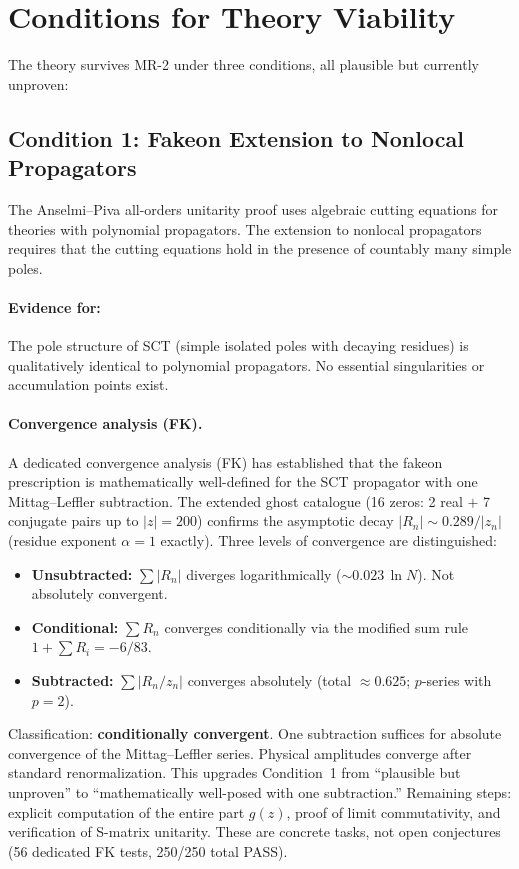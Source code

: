 \documentclass[11pt,a4paper]{article}
\begin{document}
\section{Conditions for Theory Viability}
\label{sec:conditions}

The theory survives MR-2 under three conditions, all plausible but
currently unproven:

\subsection{Condition 1: Fakeon Extension to Nonlocal Propagators}

The Anselmi--Piva all-orders unitarity proof \cite{Anselmi2018} uses
algebraic cutting equations for theories with polynomial propagators.
The extension to nonlocal propagators requires that the cutting equations
hold in the presence of countably many simple poles.

\paragraph{Evidence for:} The pole structure of SCT (simple isolated
poles with decaying residues) is qualitatively identical to polynomial
propagators.  No essential singularities or accumulation points exist.

\paragraph{Convergence analysis (FK).}
A dedicated convergence analysis (FK) has established that the
fakeon prescription is mathematically well-defined for the SCT
propagator with one Mittag--Leffler subtraction.  The extended ghost
catalogue (16 zeros: 2 real $+$ 7 conjugate pairs up to $|z| = 200$)
confirms the asymptotic decay $|R_n| \sim 0.289/|z_n|$ (residue
exponent $\alpha = 1$ exactly).  Three levels of convergence are
distinguished:
\begin{itemize}[nosep]
  \item \textbf{Unsubtracted:} $\sum |R_n|$ diverges logarithmically
    ($\sim 0.023\,\ln N$).  Not absolutely convergent.
  \item \textbf{Conditional:} $\sum R_n$ converges conditionally via the
    modified sum rule $1 + \sum R_i = -6/83$.
  \item \textbf{Subtracted:} $\sum |R_n/z_n|$ converges absolutely
    (total $\approx 0.625$; $p$-series with $p = 2$).
\end{itemize}
Classification: \textbf{conditionally convergent}.  One subtraction
suffices for absolute convergence of the Mittag--Leffler series.
Physical amplitudes converge after standard renormalization.
This upgrades Condition~1 from ``plausible but unproven'' to
``mathematically well-posed with one subtraction.''  Remaining steps:
explicit computation of the entire part $g(z)$, proof of limit
commutativity, and verification of S-matrix unitarity.  These are
concrete tasks, not open conjectures (56 dedicated FK tests, 250/250
total PASS).
\end{document}

